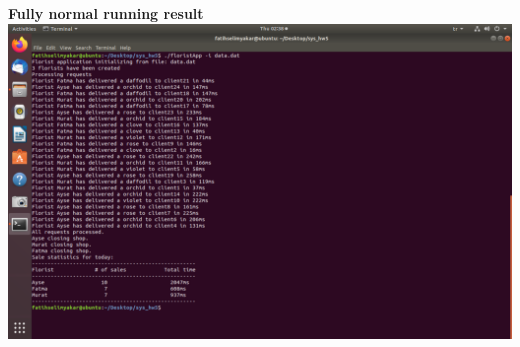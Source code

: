 \documentclass{article}
\begin{document}
\begin{center}
    \textbf{Fully normal running result} \\
    \includegraphics[scale=0.3]{normal.png}
\end{center}
    
\end{document}
